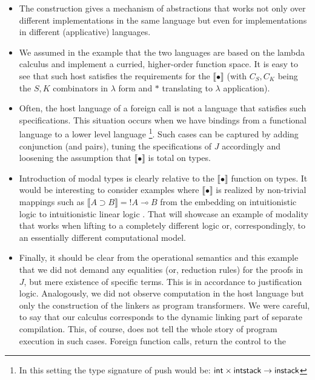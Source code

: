 					\begin{itemize}
						\item The construction gives a mechanism of abstractions that works not only over different implementations in the
						same language but even for implementations in different (applicative) languages.
						\item We assumed in the example that the  two languages are based on the lambda calculus and implement a curried, higher-order function space. 
						It is easy to see that such host satisfies the requirements for the $\llbracket\bullet\rrbracket$ 
						(with $C_S, C_K$ being the $S, K$ combinators in $\lambda$ form  and $*$ translating to $\lambda$ application).
						\item
						Often, the host language of a foreign call is  not  a language that satisfies  such specifications. This situation occurs  when we have bindings from a functional language to a lower level language \footnote{In this setting the type signature of {\sf push} would be: $\mathtt{\sf int \times intstack\rightarrow instack}$}. 
						Such cases  can be captured by adding conjunction (and pairs), tuning the  specifications of $J$  accordingly and loosening the assumption that $\llbracket \bullet \rrbracket$
						is total on types.
						\item Introduction of  modal types is clearly relative to the $\llbracket\bullet \rrbracket$ function on types. 
						It would be interesting to consider examples where   $\llbracket\bullet \rrbracket$ is realized by non-trivial mappings such as $\llbracket A\supset B \rrbracket= !A \multimap B$
						from the embedding on intuitionistic logic to intuitionistic linear logic \cite{girard1987linear}.
						That will  showcase an example of   modality that works when lifting to a completely different logic or, correspondingly, to an essentially
						different computational model.
						\item Finally, it should be clear from the operational semantics and this example that we did not demand any equalities (or, reduction rules)  
						for the proofs in $J$, but mere existence of specific terms. This is in accordance to justification logic.  Analogously, we did not observe computation 
						in the host language but only the construction of the linkers as program transformers. We were careful, to say that our calculus corresponds to the dynamic 
						linking part of 
						separate compilation. This, of course, does not tell the whole story of program execution in such cases. Foreign function calls, return the control to the 

\end{itemize}
